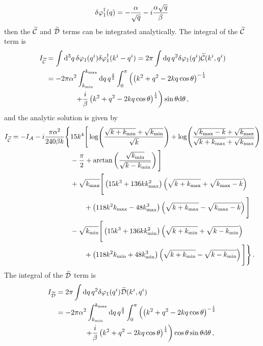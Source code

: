 % 
\begin{equation}
 \delta\varphi_{1}^{\dagger}(q) = -\frac{\alpha}{\sqrt{q}} -i\frac{\alpha\sqrt{q}}{\beta}\,
\end{equation}
% 
then the $\widetilde{\mathcal{C}}$ and $\widetilde{\mathcal{D}}$ terms can be integrated analytically.
The integral of the $\widetilde{\mathcal{C}}$ term is 
% 
\begin{align}
 \label{eq:cint-num}
I_{\wt{\C}} &= \int\d^3 q\, \dvp1(\qvi) \dN{\dvp1}(\kvi-\qvi) 
    = 2\pi \int \d q\, q^2 \dvp1(\qvi) \wt{\C}(\kvi, \qvi) \nonumber\\
% 
 &= -2\pi\alpha^2 \int_{\kmin}^{\kmax} \d q\, q^{\frac{3}{2}} \int_0^\pi 
     \left( \left(k^2 + q^2 -2kq \cos\theta\right)^{-\frac{1}{4}} \right.\nonumber \\
            &\qquad \qquad \left.+\frac{i}{\beta}\left(k^2 + q^2 -2kq
\cos\theta\right)^{\frac{1}{4}}
        \right) \sin\theta \d \theta\,,
\end{align}
% 
and the analytic solution is given by
% 
\begin{align}
\label{eq:cint-soln-num}
I_{\wt{\C}} = -I_\A -i\frac{\pi\alpha^2}{240 \beta k}\Bigg\{ 
        &15 k^4 \Bigg[ \log\Biggl(\frac{\sqrt{k+\kmin} + \sqrt{\kmin}}{\sqrt{k}}
                            \Biggr)
         + \log\Biggl( \frac{\sqrt{\kmax-k} + \sqrt{\kmax}}{\sqrt{k+\kmax}
                        +\sqrt{\kmax}}\Biggr) \nonumber \\
        &-\frac{\pi}{2} + \arctan\left( \frac{\sqrt{\kmin}}{\sqrt{k-\kmin}}\right)
        \Bigg] \nonumber\\
% 
        &+\sqrt{\kmax}\Bigg[ \left(15k^3 + 136k\kmax^2 \right)\left(\sqrt{k+\kmax} +
          \sqrt{\kmax-k}\right) \nonumber \\
        &\qquad +\left(118k^2\kmax -48\kmax^3\right) \left(\sqrt{k+\kmax} -
         \sqrt{\kmax -k} \right) \Bigg] \nonumber \\
% 
        &-\sqrt{\kmin}\Bigg[ \left(15k^3 + 136k\kmin^2 \right)\left(\sqrt{k+\kmin} +
          \sqrt{k-\kmin}\right) \nonumber \\
        &\qquad +\left(118k^2\kmin +48\kmin^3\right) \left(\sqrt{k+\kmin} -
         \sqrt{k-\kmin} \right) \Bigg] \Bigg\} \,.
\end{align}
The integral of the $\widetilde{\mathcal{D}}$ term is 
% 
\begin{align}
 \label{eq:dint-num}
I_{\wt{\D}} &= 2\pi \int \d q\, q^2 \dvp1(\qvi) \wt{\D}(\kvi, \qvi) \\
% 
 &= -2\pi\alpha^2 \int_{\kmin}^{\kmax} \d q\, q^{\frac{3}{2}} \int_0^\pi 
     \left( \left(k^2 + q^2 -2kq \cos\theta\right)^{-\frac{1}{4}} \right.\nonumber\\
% 
        &\qquad\qquad\left.+\frac{i}{\beta}\left(k^2 + q^2 -2kq
\cos\theta\right)^{\frac{1}{4}}
        \right) \cos\theta\sin\theta \d \theta\,,
\end{align}
